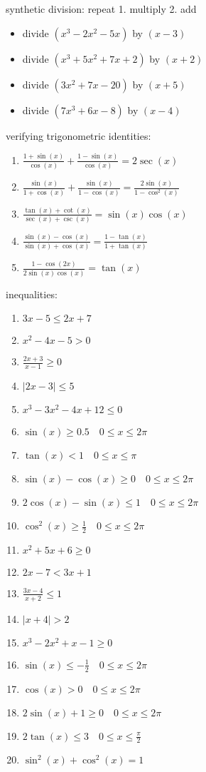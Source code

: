 \documentclass{article}
\begin{document}
synthetic division: repeat 1. multiply  2. add
	\begin{itemize}
		\item divide $(x^3-2x^2-5x)$ by $(x-3)$
		\item divide $(x^3+5x^2+7x+2)$ by $(x+2)$ 
		\item divide $(3x^2+7x-20)$ by $(x+5)$
		\item divide $(7x^3+6x-8)$ by $(x-4)$ 
	\end{itemize}

verifying trigonometric identities:
	\begin{enumerate}
		\item $\frac{1 + \sin(x)}{\cos(x)} + \frac{1 - \sin(x)}{\cos(x)} = 2\sec(x)$
		\item $\frac{\sin(x)}{1 + \cos(x)} + \frac{\sin(x)}{1 - \cos(x)} = \frac{2\sin(x)}{1 - \cos^2(x)}$
		\item $\frac{\tan(x) + \cot(x)}{\sec(x) + \csc(x)} = \sin(x)\cos(x)$
		\item $\frac{\sin(x) - \cos(x)}{\sin(x) + \cos(x)} = \frac{1 - \tan(x)}{1 + \tan(x)}$
		\item $\frac{1 - \cos(2x)}{2\sin(x)\cos(x)} = \tan(x)$
	\end{enumerate}

inequalities:
\begin{enumerate}
        \item $3x - 5 \leq 2x + 7$
        \item $x^2 - 4x - 5 > 0$
        \item $\frac{2x + 3}{x - 1} \geq 0$
        \item $|2x - 3| \leq 5$
        \item $x^3 - 3x^2 - 4x + 12 \leq 0$
        \item $\sin(x) \geq 0.5 \quad 0 \leq x \leq 2\pi$
        \item $\tan(x) < 1 \quad 0 \leq x \leq \pi$
        \item $\sin(x) - \cos(x) \geq 0 \quad 0 \leq x \leq 2\pi$
        \item $2\cos(x) - \sin(x) \leq 1 \quad 0 \leq x \leq 2\pi$
        \item $\cos^2(x) \geq \frac{1}{2} \quad 0 \leq x \leq 2\pi$
        \item $x^2 + 5x + 6 \geq 0$
        \item $2x - 7 < 3x + 1$
        \item $\frac{3x - 4}{x + 2} \leq 1$
        \item $|x + 4| > 2$
        \item $x^3 - 2x^2 + x - 1 \geq 0$
        \item $\sin(x) \leq -\frac{1}{2} \quad 0 \leq x \leq 2\pi$
        \item $\cos(x) > 0 \quad 0 \leq x \leq 2\pi$
        \item $2\sin(x) + 1 \geq 0 \quad 0 \leq x \leq 2\pi$
        \item $2\tan(x) \leq 3 \quad 0 \leq x \leq \frac{\pi}{2}$
        \item $\sin^2(x) + \cos^2(x) = 1$
\end{enumerate}
\end{document}
